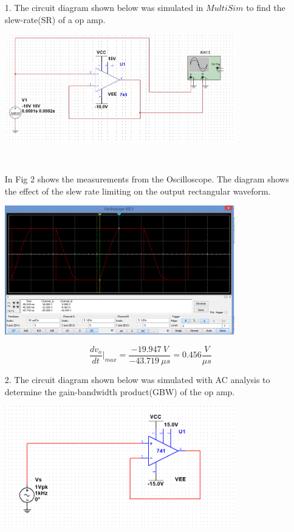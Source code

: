 \documentclass[11pt,a4paper]{article}
\begin{document}
\begin{enumerate}
  \item[1.]
  The circuit diagram shown below was simulated in $MultiSim$ to find the slew-rate(SR) of a op amp.\\
    \begin{minipage}{\linewidth}
      \centering       
       \includegraphics[width=10cm]{Task1-1Circuit}\\
    \end{minipage}\\
\pagebreak
\pagebreak

In Fig 2 shows the measurements from the Oscilloscope. The diagram shows the effect of the slew rate limiting on the output rectangular waveform.\\
    \begin{minipage}{\linewidth}
      \centering       
       \includegraphics[width=10cm]{Task1-1-Oscilloscope}\\
    \end{minipage}
$$ \dfrac{dv_{o}}{dt}|_{max} = \dfrac{-19.947 \ V}{-43.719\ \mu s} = 0.456 \frac{V}{\mu s} $$
  \item[2.]
  The circuit diagram shown below was simulated with AC analysis to determine the gain-bandwidth product(GBW) of the op amp.  
  
      \begin{minipage}{\linewidth}
      \centering
        \includegraphics[width=10cm]{Task1-2-Circuit}\\
    \end{minipage}
    

\end{enumerate}
\end{document}

